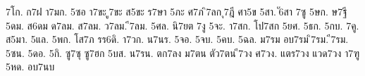 {7โก.
ก7ฝ
า7มก.
5ซอ
า7ขะ
ู7ขะ
ส5ขะ
ร7ษา
5ภะ
ศ7ภ
ิ7ลก
ุ7ฎี
ศา5ข
5สา.
ั6สา
7ซู
5ษก.
ษ7ฐี
5ดม.
ส6ดม
ด7ลม.
ส7ลม.
ว7ลม.
ี7ลม.
5ศล.
นิ7ยต
7งู
5จะ.
า7สก.
โป7สก
5ยศ.
5ธก.
5กบ.
7คู.
ส5มา.
5แล.
5พก.
โส7ภ
รร6ดิ.
า7วก.
น7นร.
5จอ.
5จบ.
5คบ.
5ฉล.
ม7รม
อบ7รม
ิ7รม.
ี7รม.
5ซน.
5ดอ.
5กิ.
ซู7ซุ
ซู7ฮก
5บส.
น7รน.
ตก7ลง
ม7ตน
ตัว7ตน
ี7วง
ศ7วง.
แตร7วง
แวด7วง
า7ฑู
5หด.
อบ7นบ
}
